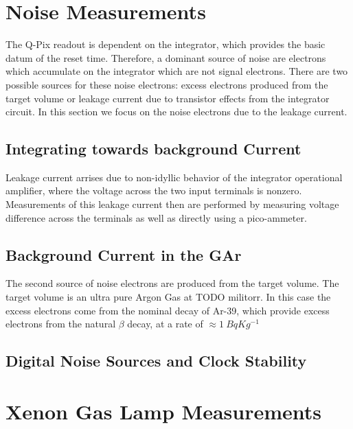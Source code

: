\section{Noise Measurements}

The Q-Pix readout is dependent on the integrator, which provides the basic datum of the reset time.
Therefore, a dominant source of noise are electrons which accumulate on the integrator which are not signal electrons.
There are two possible sources for these noise electrons: excess electrons produced from the target volume or leakage current due to transistor effects from the integrator circuit.
In this section we focus on the noise electrons due to the leakage current.

\subsection{Integrating towards background Current}

Leakage current arrises due to non-idyllic behavior of the integrator operational amplifier, where the voltage across the two input terminals is nonzero.
Measurements of this leakage current then are performed by measuring voltage difference across the terminals as well as directly using a pico-ammeter.

\subsection{Background Current in the GAr}

The second source of noise electrons are produced from the target volume.
The target volume is an ultra pure Argon Gas at TODO militorr.
In this case the excess electrons come from the nominal decay of Ar-39, which provide excess electrons from the natural $\beta$ decay, at a rate of $\approx 1~\unit{Bq}{Kg^{-1}}$

\subsection{Digital Noise Sources and Clock Stability}


\section{Xenon Gas Lamp Measurements}

